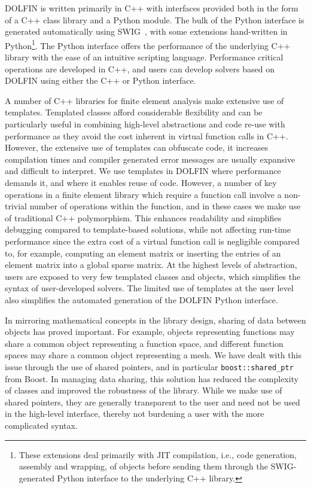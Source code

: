 \documentclass[acmtoms]{acmtrans2m}
\newcommand{\emp}[1]{\texttt{#1}}
\newcommand{\dolfin}{DOLFIN}
\begin{document}
\dolfin{} is written primarily in C++ with interfaces provided both in
the form of a C++ class library and a Python module. The bulk of the
Python interface is generated automatically using
SWIG~\cite{swig:www,beazley:2003}, with some extensions hand-written
in Python\footnote{These extensions deal primarily with JIT
  compilation, i.e., code generation, assembly and wrapping, of
  objects before sending them through the SWIG-generated Python
  interface to the underlying C++ library.}. The Python interface
offers the performance of the underlying C++ library with the ease of
an intuitive scripting language. Performance critical operations are
developed in C++, and users can develop solvers based on \dolfin{}
using either the C++ or Python interface.

A number of C++ libraries for finite element analysis make extensive
use of templates. Templated classes afford considerable flexibility
and can be particularly useful in combining high-level abstractions
and code re-use with performance as they avoid the cost inherent in
virtual function calls in C++. However, the extensive use of templates
can obfuscate code, it increases compilation times and
compiler generated error messages are usually expansive and difficult
to interpret. We use templates in \dolfin{} where
performance demands it, and where it enables reuse of code.
However, a number of key operations in a finite element library
which require a function call involve a non-trivial number of operations
within the function, and in these cases we make use of traditional C++
polymorphism. This enhances readability and simplifies debugging
compared to template-based solutions, while not affecting run-time
performance since the extra cost of a virtual function call is
negligible compared to, for example, computing an element matrix or
inserting the entries of an element matrix into a global sparse matrix.
At the highest levels of abstraction, users are exposed to
very few templated classes and objects, which simplifies the syntax of
user-developed solvers. The limited use of templates at the user level
also simplifies the automated generation of the \dolfin{} Python
interface.

In mirroring mathematical concepts in the library design, sharing of
data between objects has proved important. For example, objects
representing functions may share a common object representing a
function space, and different function spaces may share a common
object representing a mesh. We have dealt with this issue through the
use of shared pointers, and in particular
\emp{boost::shared\_ptr} from Boost. In managing data sharing, this
solution has reduced the complexity of classes and improved the
robustness of the library.  While we make use of shared
pointers, they are generally transparent to the user and need not be
used in the high-level interface, thereby not burdening a user with
the more complicated syntax.
\end{document}
